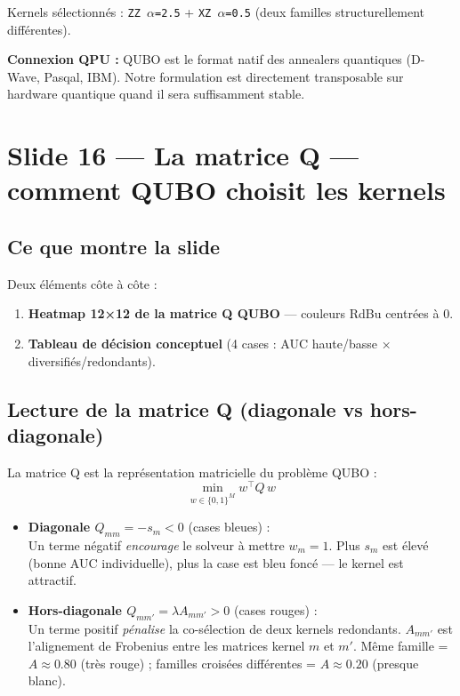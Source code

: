 \documentclass[12pt, a4paper]{article}
\begin{document}
Kernels sélectionnés : \texttt{ZZ $\alpha$=2.5} + \texttt{XZ $\alpha$=0.5}
(deux familles structurellement différentes).

\begin{bon}
\textbf{Connexion QPU :} QUBO est le format natif des annealers quantiques
(D-Wave, Pasqal, IBM). Notre formulation est directement transposable sur hardware
quantique quand il sera suffisamment stable.
\end{bon}

\section{Slide 16 — La matrice Q — comment QUBO choisit les kernels}

\subsection*{Ce que montre la slide}

Deux éléments côte à côte :
\begin{enumerate}
  \item \textbf{Heatmap 12×12 de la matrice Q QUBO} — couleurs RdBu centrées à 0.
  \item \textbf{Tableau de décision conceptuel} (4 cases : AUC haute/basse × diversifiés/redondants).
\end{enumerate}

\subsection*{Lecture de la matrice Q (diagonale vs hors-diagonale)}

La matrice Q est la représentation matricielle du problème QUBO :
$$\min_{w \in \{0,1\}^M} w^\top Q\, w$$

\begin{itemize}
  \item \textbf{Diagonale $Q_{mm} = -s_m < 0$} (cases bleues) :\\
        Un terme négatif \emph{encourage} le solveur à mettre $w_m = 1$.
        Plus $s_m$ est élevé (bonne AUC individuelle), plus la case est bleu foncé
        — le kernel est attractif.

  \item \textbf{Hors-diagonale $Q_{mm'} = \lambda A_{mm'} > 0$} (cases rouges) :\\
        Un terme positif \emph{pénalise} la co-sélection de deux kernels redondants.
        $A_{mm'}$ est l'alignement de Frobenius entre les matrices kernel $m$ et $m'$.
        Même famille = $A \approx 0.80$ (très rouge) ;
        familles croisées différentes = $A \approx 0.20$ (presque blanc).
\end{itemize}
\end{document}
